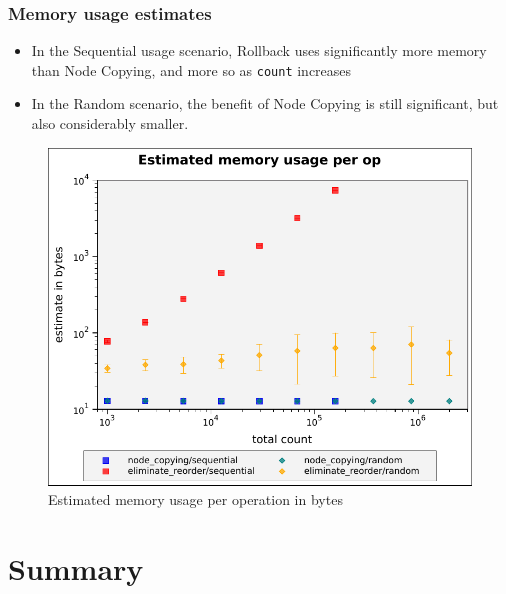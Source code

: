 \documentclass{beamer}
\begin{document}
\begin{frame}
\frametitle{Memory usage estimates}

\begin{itemize}

  \item In the Sequential usage scenario, Rollback uses significantly more
  memory than Node Copying, and more so as \texttt{count} increases

  \item In the Random scenario, the benefit of Node Copying is still
  significant, but also considerably smaller.

\end{itemize}

\end{frame}

\begin{frame}
\begin{figure}
  \center
  \includegraphics[height=0.65\textheight]{figures/graphs/space-results-per-op.pdf}
  \caption{Estimated memory usage per operation in bytes}
\end{figure}
\end{frame}

\section*{Summary}
\end{document}
